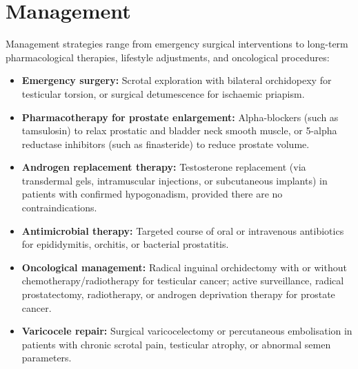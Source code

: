 \section*{Management}
Management strategies range from emergency surgical interventions to long-term pharmacological therapies, lifestyle adjustments, and oncological procedures:
\begin{itemize}
    \item \textbf{Emergency surgery:} Scrotal exploration with bilateral orchidopexy for testicular torsion, or surgical detumescence for ischaemic priapism.
    \item \textbf{Pharmacotherapy for prostate enlargement:} Alpha-blockers (such as tamsulosin) to relax prostatic and bladder neck smooth muscle, or 5-alpha reductase inhibitors (such as finasteride) to reduce prostate volume.
    \item \textbf{Androgen replacement therapy:} Testosterone replacement (via transdermal gels, intramuscular injections, or subcutaneous implants) in patients with confirmed hypogonadism, provided there are no contraindications.
    \item \textbf{Antimicrobial therapy:} Targeted course of oral or intravenous antibiotics for epididymitis, orchitis, or bacterial prostatitis.
    \item \textbf{Oncological management:} Radical inguinal orchidectomy with or without chemotherapy/radiotherapy for testicular cancer; active surveillance, radical prostatectomy, radiotherapy, or androgen deprivation therapy for prostate cancer.
    \item \textbf{Varicocele repair:} Surgical varicocelectomy or percutaneous embolisation in patients with chronic scrotal pain, testicular atrophy, or abnormal semen parameters.
\end{itemize}

